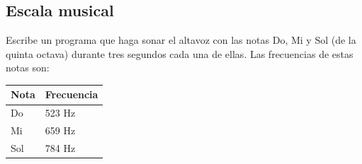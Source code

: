 \subsection{Escala musical}

Escribe un programa que haga sonar el altavoz con las notas Do, Mi
y Sol (de la quinta octava) durante tres segundos cada una de ellas.
Las frecuencias de estas notas son:

\begin{longtable}{| p{2cm} | p{3cm} |}
\hline
{\bf Nota} & {\bf Frecuencia} \\ \hline
Do  & 523 Hz \\ \hline
Mi  & 659 Hz\\ \hline
Sol & 784 Hz\\ \hline
\end{longtable}

\chapterend{}
